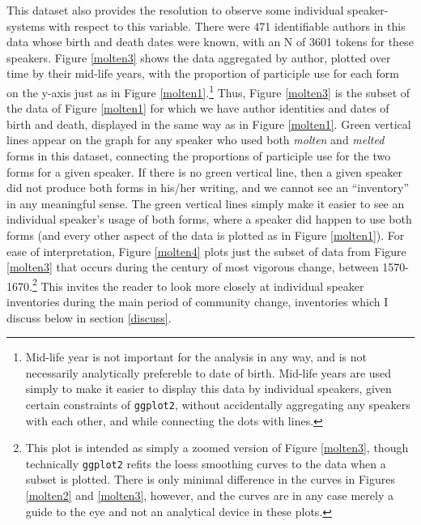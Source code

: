 \documentclass{artikel3}
\begin{document}
This dataset also provides the resolution to observe some individual speaker-systems with respect to this variable. There were 471 identifiable authors in this data whose birth and death dates were known, with an N of 3601 tokens for these speakers. Figure \ref{molten3} shows the data aggregated by author, plotted over time by their mid-life years, with the proportion of participle use for each form on the y-axis just as in Figure \ref{molten1}.\footnote{Mid-life year is not important for the analysis in any way, and is not necessarily analytically prefereble to date of birth. Mid-life years are used simply to make it easier to display this data by individual speakers, given certain constraints of \texttt{ggplot2}, without accidentally aggregating any speakers with each other, and while connecting the dots with lines.} Thus, Figure \ref{molten3} is the subset of the data of Figure \ref{molten1} for which we have author identities and dates of birth and death, displayed in the same way as in Figure \ref{molten1}. Green vertical lines appear on the graph for any speaker who used both \textsl{molten} and \textsl{melted} forms in this dataset, connecting the proportions of participle use for the two forms for a given  speaker. If there is no green vertical line, then a given speaker did not produce both forms in his/her writing, and we cannot see an ``inventory'' in any meaningful sense. The green vertical lines simply make it easier to see an individual speaker's usage of both forms, where a speaker did happen to use both forms (and every other aspect of the data is plotted as in Figure \ref{molten1}). For ease of interpretation, Figure \ref{molten4} plots just the subset of data from Figure \ref{molten3} that occurs during the century of most vigorous change, between 1570-1670.\footnote{This plot is intended as simply a zoomed version of Figure \ref{molten3}, though technically \texttt{ggplot2} refits the loess smoothing curves to the data when a subset is plotted. There is only minimal difference in the curves in Figures \ref{molten2} and \ref{molten3}, however, and the curves are in any case merely a guide to the eye and not an analytical device in these plots.} This invites the reader to look more closely at individual speaker inventories during the main period of community change, inventories which I discuss below in section \ref{discuss}.
\end{document}
